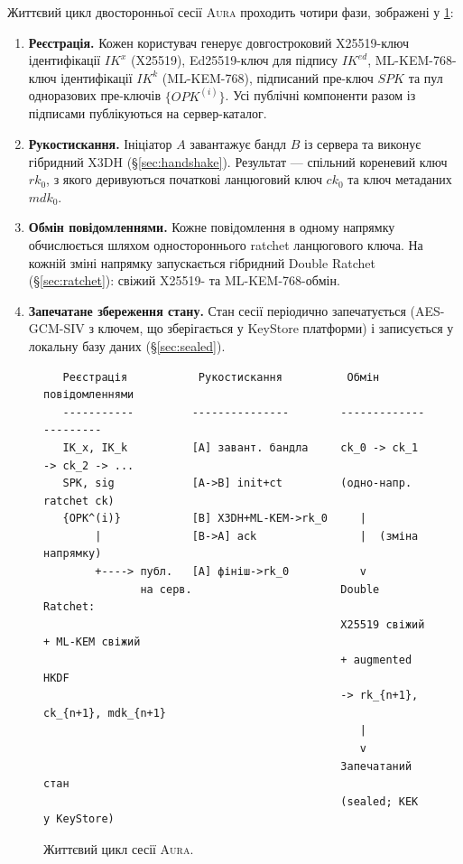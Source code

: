 \documentclass[11pt,a4paper]{article}
\theoremstyle{definition}
\renewcommand{\DH}{\textsf{X25519}}
\newcommand{\KEM}{\textsf{ML-KEM-768}}
\newcommand{\rk}{\ensuremath{\mathit{rk}}}
\newcommand{\ck}{\ensuremath{\mathit{ck}}}
\newcommand{\mdk}{\ensuremath{\mathit{mdk}}}
\newcommand{\IK}{\ensuremath{\mathit{IK}}}
\newcommand{\SPK}{\ensuremath{\mathit{SPK}}}
\newcommand{\OPK}{\ensuremath{\mathit{OPK}}}
\newcommand{\Aura}{\mbox{\normalfont\scshape Aura}}
\begin{document}
Життєвий цикл двосторонньої сесії \Aura{} проходить чотири фази,
зображені у \cref{fig:lifecycle}:

\begin{enumerate}
  \item \textbf{Реєстрація.} Кожен користувач генерує довгостроковий
    \DH{}-ключ ідентифікації $\IK^x$ (X25519), Ed25519-ключ для підпису
    $\IK^{ed}$,
    \KEM{}-ключ ідентифікації $\IK^k$ (ML-KEM-768), підписаний пре-ключ
    $\SPK$ та пул одноразових пре-ключів $\{\OPK^{(i)}\}$. Усі публічні
    компоненти разом із підписами публікуються на сервер-каталог.
  \item \textbf{Рукостискання.} Ініціатор $A$ завантажує бандл $B$ із
    сервера та виконує гібридний X3DH (\S\ref{sec:handshake}). Результат —
    спільний кореневий ключ $\rk_0$, з якого деривуються початкові
    ланцюговий ключ $\ck_0$ та ключ метаданих $\mdk_0$.
  \item \textbf{Обмін повідомленнями.} Кожне повідомлення в одному
    напрямку обчислюється шляхом одностороннього ratchet ланцюгового
    ключа. На кожній зміні напрямку запускається гібридний Double
    Ratchet (\S\ref{sec:ratchet}): свіжий \DH{}- та \KEM{}-обмін.
  \item \textbf{Запечатане збереження стану.} Стан сесії періодично
    запечатується (AES-GCM-SIV з ключем, що зберігається у KeyStore
    платформи) і записується у локальну базу даних
    (\S\ref{sec:sealed}).
\end{enumerate}

\begin{figure}[H]
\centering
\begin{minipage}{0.95\textwidth}
\small
\begin{verbatim}
   Реєстрація           Рукостискання          Обмін повідомленнями
   -----------         ---------------        ----------------------
   IK_x, IK_k          [A] завант. бандла     ck_0 -> ck_1 -> ck_2 -> ...
   SPK, sig            [A->B] init+ct         (одно-напр. ratchet ck)
   {OPK^(i)}           [B] X3DH+ML-KEM->rk_0     |
        |              [B->A] ack                |  (зміна напрямку)
        +----> публ.   [A] фініш->rk_0           v
               на серв.                       Double Ratchet:
                                              X25519 свіжий + ML-KEM свіжий
                                              + augmented HKDF
                                              -> rk_{n+1}, ck_{n+1}, mdk_{n+1}
                                                 |
                                                 v
                                              Запечатаний стан
                                              (sealed; KEK у KeyStore)
\end{verbatim}
\end{minipage}
\caption{Життєвий цикл сесії \Aura{}.}\label{fig:lifecycle}
\end{figure}
\end{document}
